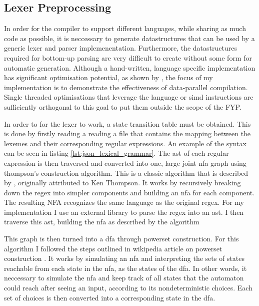 \subsection{Lexer Preprocessing}

In order for the compiler to support different languages, while sharing as much code as possible,
it is neccessary to generate datastructures that can be used by a generic lexer and parser
implemenentation. Furthermore, the datastructures required for bottom-up parsing are very difficult
to create without some form for automatic generation. Although a hand-written, language specific
implementation has significant optimisation potential, as shown by \cite{langdale_parsing_2019},
the focus of my implementation is to demonstrate the effectiveness of data-parallel compilation.
Single threaded optimisations that leverage the language or \gls{simd} instructions are sufficiently
orthogonal to this goal to put them outside the scope of the FYP. 

In order to for the lexer to work, a state transition table must be obtained. This is
done by firstly reading a reading a file that contains the mapping between the lexemes and
their corresponding regular expressions. An example of the syntax can be seen in listing
\ref{lst:json_lexical_grammar}. The \gls{ast} of each regular expression is then traversed and
converted into one, large joint \gls{nfa} graph using thompson's construction algorithm. This is
a classic algorithm that is described by \cite{aho_compilers_2006}, originally attributed to Ken
Thompson. It works by recursively breaking down the regex into simpler components and building
an \gls{nfa} for each component. The resulting NFA recognizes the same language as the original
regex. For my implementation I use an external library to parse the regex into an \gls{ast}. I then
traverse this \gls{ast}, building the \gls{nfa} as described by the algorithm

This graph is then turned into a \gls{dfa} through powerset construction. For this
algorithm I followed the steps outlined in wikipedia article on powerset construction
\citep{noauthor_powerset_2023}. It works by simulating an \gls{nfa} and interpreting the sets of
states reachable from each state in the \gls{nfa}, as the states of the \gls{dfa}. In other words,
it neccessary to simulate the \gls{nfa} and keep track of all states that the automaton could
reach after seeing an input, according to its nondeterministic choices. Each set of choices is then
converted into a corresponding state in the \gls{dfa}.

